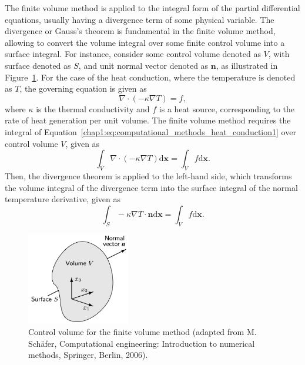The finite volume method is applied to the integral form of the partial differential equations, usually having a divergence term of some physical variable.
The divergence or Gauss's theorem is fundamental in the finite volume method, allowing to convert the volume integral over some finite control volume into a surface integral.
For instance, consider some control volume denoted as $V$, with surface denoted as $S$, and unit normal vector denoted as $\bm{n}$, as illustrated in Figure~\ref{chap1:fig:computational_methods_control_volume}.
For the case of the heat conduction, where the temperature is denoted as $T$, the governing equation is given as
\begin{equation}
\nabla\cdot\left(-\kappa\nabla T\right)=f,
\label{chap1:eq:computational_methods_heat_conduction1}
\end{equation}
where $\kappa$ is the thermal conductivity and $f$ is a heat source, corresponding to the rate of heat generation per unit volume.
The finite volume method requires the integral of Equation~\cref{chap1:eq:computational_methods_heat_conduction1} over control volume $V$, given as
\begin{equation}
\int_{V}\nabla\cdot\left(-\kappa\nabla T\right)\textrm{d}\bm{x}=\int_{V}f\textrm{d}\bm{x}.
\label{chap1:eq:computational_methods_heat_conduction2}
\end{equation}
Then, the divergence theorem is applied to the left-hand side, which transforms the volume integral of the divergence term into the surface integral of the normal temperature derivative, given as
\begin{equation}
\int_{S}-\kappa\nabla T\cdot\bm{n}\textrm{d}\bm{x}=\int_{V}f\textrm{d}\bm{x}.
\label{chap1:eq:computational_methods_heat_conduction3}
\end{equation}

\begin{figure}[!htp]
\centering
\includegraphics[width=0.4\textwidth]{chap1/include/figures/control_volume.png}
\caption[Control volume for the finite volume method.]{Control volume for the finite volume method (adapted from M. Sch\"afer, Computational engineering: Introduction to numerical methods, Springer, Berlin, 2006).}
\label{chap1:fig:computational_methods_control_volume}
\end{figure}

